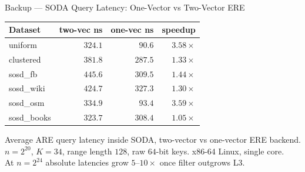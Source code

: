 \begin{frame}{Backup --- SODA Query Latency: One-Vector vs Two-Vector ERE}
  \centering
  \footnotesize
  \begin{tabular}{@{}lrrr@{}}
    \toprule
    Dataset       & two-vec ns & one-vec ns & speedup \\
    \midrule
    uniform       & $324.1$ & $90.6$  & $3.58\times$ \\
    clustered     & $381.8$ & $287.5$ & $1.33\times$ \\
    sosd\_fb      & $445.6$ & $309.5$ & $1.44\times$ \\
    sosd\_wiki    & $424.7$ & $327.3$ & $1.30\times$ \\
    sosd\_osm     & $334.9$ & $93.4$  & $3.59\times$ \\
    sosd\_books   & $323.7$ & $308.4$ & $1.05\times$ \\
    \bottomrule
  \end{tabular}

  \vspace{0.8em}
  {\footnotesize
    Average ARE query latency inside SODA, two-vector vs one-vector ERE backend.\\
    $n = 2^{20}$, $K = 34$, range length $128$, raw $64$-bit keys. x86-64 Linux, single core.\\
    At $n = 2^{24}$ absolute latencies grow $5$--$10\times$ once filter outgrows L3.
  }
\end{frame}
